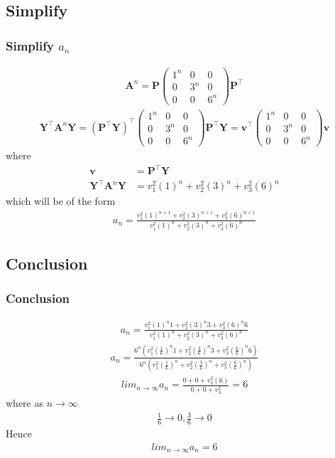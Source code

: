 \documentclass{beamer}
\providecommand{\brak}[1]{\ensuremath{\left(#1\right)}}
\theoremstyle{remark}
\newcommand{\myvec}[1]{\ensuremath{\begin{pmatrix}#1\end{pmatrix}}}
\let\vec\mathbf
\numberwithin{equation}{section}
\begin{document}
\subsection{Simplify}
\begin{frame}[fragile]
\frametitle{Simplify $a_n$}
\begin{align}
\vec{A}^n=\vec{P}\myvec{1^n&0&0\\0&3^n&0\\0&0&6^n}\vec{P}^\top 
\end{align}
\begin{align}
\vec{Y}^\top\vec{A}^n\vec{Y}=\brak{\vec{P^\top}\vec{Y}}^\top \myvec{1^n&0&0\\0&3^n&0\\0&0&6^n}\vec{P}^\top\vec{Y}=\vec{v}^\top\myvec{1^n&0&0\\0&3^n&0\\0&0&6^n}\vec{v}
\end{align}
where
\begin{align}
    \vec{v}&=\vec{P}^\top\vec{Y} \\
\vec{Y}^\top\vec{A}^n\vec{Y}&=v_1^2\brak{1}^n+v_2^2\brak{3}^n+v_3^2\brak{6}^n
\end{align}
which will be of the form
\begin{align}
a_n=\frac{v_1^2\brak{1}^{n+1}+v_2^2\brak{3}^{n+1}+v_3^2\brak{6}^{n+1}}{v_1^2\brak{1}^n+v_2^2\brak{3}^n+v_3^2\brak{6}^n}
\end{align}
\end{frame}
 \subsection{Conclusion}
\begin{frame}[fragile]
\frametitle{Conclusion}
\begin{align}
a_n=\frac{v_1^2\brak{1}^{n}1+v_2^2\brak{3}^{n}3+v_3^2\brak{6}^{n}6}{v_1^2\brak{1}^n+v_2^2\brak{3}^n+v_3^2\brak{6}^n} 
\end{align}
\begin{align}
   a_n= \frac{6^n\brak{v_1^2\brak{\frac{1}{6}}^{n}1+v_2^2\brak{\frac{3}{6}}^{n}3+v_3^2\brak{\frac{6}{6}}^{n}6}}{6^n\brak{v_1^2\brak{\frac{1}{6}}^n+v_2^2\brak{\frac{3}{6}}^n+v_3^2\brak{\frac{6}{6}}^n}} 
\end{align}
\begin{align}
    lim_{n\rightarrow\infty}a_n = \frac{0+0+v_3^2\brak{6}}{0+0+v_3^2}=6
\end{align}
where as $n\rightarrow\infty$
\begin{align}
    \frac{1}{6} \rightarrow 0 ,\frac{3}{6} \rightarrow 0
\end{align}
Hence
\begin{align}
    lim_{n\rightarrow\infty}a_n=6
\end{align}
\end{frame}
\end{document}
